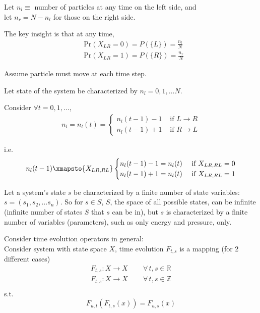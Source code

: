 \documentclass[10pt]{amsart}
\begin{document}
\begin{multicols*}{2}
Let $n_l \equiv $ number of particles at any time on the left side, and \\
let $n_r = N - n_l$ for those on the right side.

The key insight is that at any time, 
\[
\begin{aligned}
	& \text{Pr}(X_{LR} = 0) = P(\lbrace L \rbrace ) = \frac{n_l}{N} \\ 
	& \text{Pr}(X_{LR} = 1) = P(\lbrace R \rbrace ) = \frac{n_r}{N} 
\end{aligned}
\]

Assume particle must move at each time step.

Let state of the system be characterized by $n_l = 0,1, \dots N$. 

Consider $\forall t = 0,1,\dots $, 
\[
\begin{gathered}
	n_l = n_l(t) = \begin{cases} n_l(t-1) - 1 & \text{ if } L \to R \\
	n_l(t-1) + 1 & \text{ if } R \to L \end{cases} 
\end{gathered}
\]

i.e. 
\[
\begin{gathered}
n_l(t-1) \xmapsto{ X_{LR, RL}} \begin{cases} n_l(t-1) - 1 = n_l(t) & \text{ if } X_{LR,RL} = 0 \\
n_l(t-1) + 1 = n_l(t) & \text{ if } X_{LR,RL} = 1 \end{cases}
\end{gathered}
\]

Let a system's state $s$ be characterized by a finite number of state variables: $s=(s_1, s_2, \dots s_n)$. So for $s\in S$, $S$, the space of all possible states, can be infinite (infinite number of states $S$ that $s$ can be in), but $s$ is characterized by a finite number of variables (parameters), such as only energy and pressure, only.

Consider time evolution operators in general: \\
Consider system with state space $X$, time evolution $F_{t,s}$ is a mapping (for 2 different cases)
\[
\begin{gathered}
F_{t,s} : X \to X \qquad \, \forall \, t, s \in \mathbb{R} \\ 
F_{t,s} : X \to X \qquad \, \forall \, t, s \in \mathbb{Z} \\ 
\end{gathered}
\]
s.t. 
\[
F_{u,t} (F_{t,s}(x)) = F_{u,s}(x)
\]


\end{multicols*}
\end{document}
